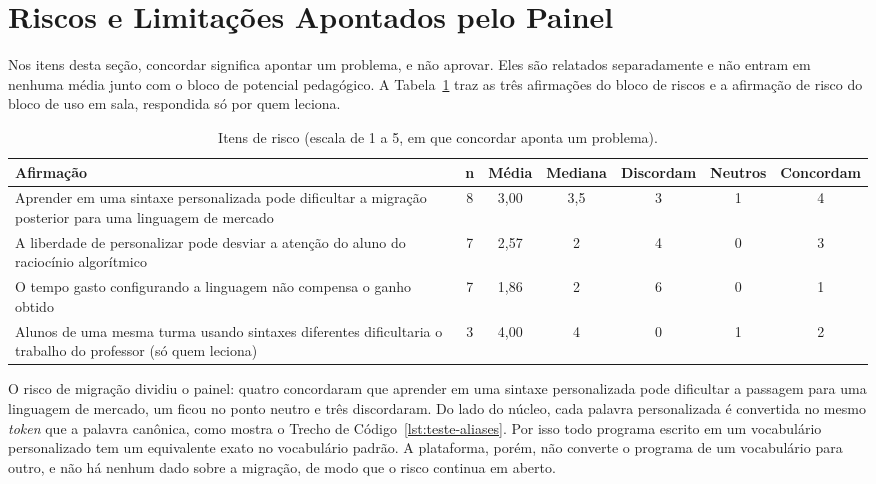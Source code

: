 \section{Riscos e Limitações Apontados pelo Painel}
\label{sec:resultado-riscos}

Nos itens desta seção, concordar significa apontar um problema, e não aprovar. Eles são relatados separadamente e não entram em nenhuma média junto com o bloco de potencial pedagógico. A Tabela~\ref{tab:resultado-riscos} traz as três afirmações do bloco de riscos e a afirmação de risco do bloco de uso em sala, respondida só por quem leciona.

\begin{table}[htbp]
\centering
\caption{Itens de risco (escala de 1 a 5, em que concordar aponta um problema).}
\label{tab:resultado-riscos}
\footnotesize
\renewcommand{\arraystretch}{1.2}
\begin{tabular}{|p{5.8cm}|c|c|c|c|c|c|}
\hline
\textbf{Afirmação} & \textbf{n} & \textbf{Média} & \textbf{Mediana} & \textbf{Discordam} & \textbf{Neutros} & \textbf{Concordam} \\\hline
Aprender em uma sintaxe personalizada pode dificultar a migração posterior para uma linguagem de mercado & 8 & 3,00 & 3,5 & 3 & 1 & 4 \\\hline
A liberdade de personalizar pode desviar a atenção do aluno do raciocínio algorítmico & 7 & 2,57 & 2 & 4 & 0 & 3 \\\hline
O tempo gasto configurando a linguagem não compensa o ganho obtido & 7 & 1,86 & 2 & 6 & 0 & 1 \\\hline
Alunos de uma mesma turma usando sintaxes diferentes dificultaria o trabalho do professor (só quem leciona) & 3 & 4,00 & 4 & 0 & 1 & 2 \\\hline
\end{tabular}
\end{table}

O risco de migração dividiu o painel: quatro concordaram que aprender em uma sintaxe personalizada pode dificultar a passagem para uma linguagem de mercado, um ficou no ponto neutro e três discordaram. Do lado do núcleo, cada palavra personalizada é convertida no mesmo \textit{token} que a palavra canônica, como mostra o Trecho de Código~\ref{lst:teste-aliases}. Por isso todo programa escrito em um vocabulário personalizado tem um equivalente exato no vocabulário padrão. A plataforma, porém, não converte o programa de um vocabulário para outro, e não há nenhum dado sobre a migração, de modo que o risco continua em aberto.

